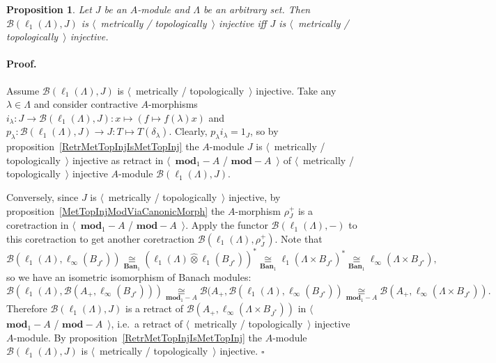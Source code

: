 \documentclass[12pt]{article}
\newcommand{\projtens}{\mathbin{\widehat{\otimes}}}
\newcommand{\isom}[1]{\mathop{\mathbin{\cong}}\limits_{#1}}
\newtheorem{proposition}[theorem]{Proposition}
\renewenvironment{proof}{\paragraph{Proof.}}{\hfill$\square$\medskip}
\begin{document}
\begin{proposition}\label{MapsFroml1toMetTopInj} Let $J$ be an $A$-module and
    $\Lambda$ be an arbitrary set. Then $\mathcal{B}(\ell_1(\Lambda),J)$ is
    $\langle$~metrically / topologically~$\rangle$ injective iff $J$ is
    $\langle$~metrically / topologically~$\rangle$ injective.
\end{proposition}
\begin{proof}
    Assume $\mathcal{B}(\ell_1(\Lambda), J)$ is $\langle$~metrically /
    topologically~$\rangle$ injective. Take any $\lambda\in\Lambda$ and consider
    contractive $A$-morphisms
    $i_\lambda:J\to\mathcal{B}(\ell_1(\Lambda),J):x\mapsto(f\mapsto
        f(\lambda)x)$ and $p_\lambda:\mathcal{B}(\ell_1(\Lambda),J)\to J:
        T\mapsto T(\delta_\lambda)$.
    Clearly, $p_\lambda i_\lambda=1_J$, so by
    proposition~\ref{RetrMetTopInjIsMetTopInj} the $A$-module $J$ is
    $\langle$~metrically / topologically~$\rangle$ injective as retract in
    $\langle$~$\mathbf{mod}_1-A$ / $\mathbf{mod}-A$~$\rangle$ of $\langle$~metrically /
    topologically~$\rangle$ injective $A$-module
    $\mathcal{B}(\ell_1(\Lambda),J)$.

    Conversely, since $J$ is $\langle$~metrically / topologically~$\rangle$
    injective, by proposition~\ref{MetTopInjModViaCanonicMorph} the $A$-morphism
    $\rho_J^+$ is a coretraction in $\langle$~$\mathbf{mod}_1-A$ / $\mathbf{mod}-A$~$\rangle$.
    Apply the functor $\mathcal{B}(\ell_1(\Lambda),-)$ to this coretraction to
    get another coretraction $\mathcal{B}(\ell_1(\Lambda),\rho_J^+)$. Note that
    $$
        \mathcal{B}(\ell_1(\Lambda),\ell_\infty(B_{J^*}))
        \isom{\mathbf{Ban}_1}
        {(\ell_1(\Lambda)\projtens \ell_1(B_{J^*}))}^*
        \isom{\mathbf{Ban}_1}
        {\ell_1(\Lambda\times B_{J^*})}^*
        \isom{\mathbf{Ban}_1}
        \ell_\infty(\Lambda\times B_{J^*}),
    $$
    so we have an isometric isomorphism of Banach modules:
    $$
        \mathcal{B}(\ell_1(\Lambda),\mathcal{B}(A_+,\ell_\infty(B_{J^*})))
        \isom{\mathbf{mod}_1-A}
        \mathcal{B}(A_+,\mathcal{B}(\ell_1(\Lambda),\ell_\infty(B_{J^*}))
        \isom{\mathbf{mod}_1-A}
        \mathcal{B}(A_+,\ell_\infty(\Lambda\times B_{J^*})).
    $$
    Therefore $\mathcal{B}(\ell_1(\Lambda),J)$ is a retract of
    $\mathcal{B}(A_+,\ell_\infty(\Lambda\times B_{J^*}))$ in
    $\langle$~$\mathbf{mod}_1-A$ / $\mathbf{mod}-A$~$\rangle$, i.e.\ a retract of
    $\langle$~metrically / topologically~$\rangle$ injective $A$-module. By
    proposition~\ref{RetrMetTopInjIsMetTopInj} the $A$-module
    $\mathcal{B}(\ell_1(\Lambda), J)$ is $\langle$~metrically /
    topologically~$\rangle$ injective.
\end{proof}
\end{document}
